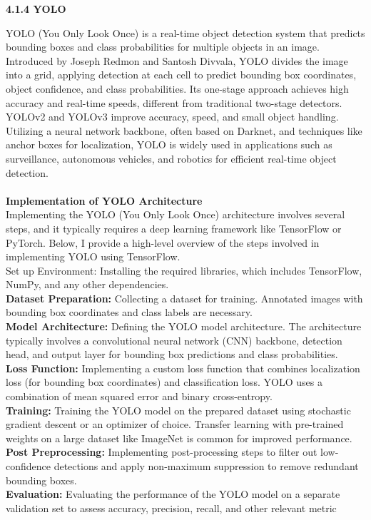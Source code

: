 \documentclass[12pt, English]{article}
\begin{document}
\begin{large}
\textbf{4.1.4 YOLO }\\
\end{large}
\text YOLO (You Only Look Once) is a real-time object detection system that predicts bounding boxes and class probabilities for multiple objects in an image. Introduced by Joseph Redmon and Santosh Divvala, YOLO divides the image into a grid, applying detection at each cell to predict bounding box coordinates, object
confidence, and class probabilities. Its one-stage approach achieves high accuracy and real-time speeds, different from traditional two-stage detectors. YOLOv2 and YOLOv3 improve accuracy, speed, and small object handling. Utilizing a neural network backbone, often based on Darknet, and techniques like anchor boxes for localization, YOLO is widely used in applications such as surveillance, autonomous vehicles, and robotics for efficient real-time object detection.\\
\\
\textbf {Implementation of YOLO Architecture}\\
Implementing the YOLO (You Only Look Once) architecture involves several steps, and it typically requires a deep learning framework like TensorFlow or PyTorch. Below, I provide a high-level overview of the steps involved in implementing YOLO using TensorFlow.\\
Set up Environment: Installing the required libraries, which includes TensorFlow, NumPy, and any other dependencies.\\
\textbf{Dataset Preparation: } Collecting a dataset for training. Annotated images with bounding box coordinates and class labels are necessary.\\
\textbf{Model Architecture: } Defining the YOLO model architecture. The architecture typically involves a convolutional neural network (CNN) backbone, detection head, and output layer for bounding box predictions and class probabilities.\\
\textbf{Loss Function: } Implementing a custom loss function that combines localization loss (for bounding box coordinates) and classification loss. YOLO uses a combination of mean squared error and binary cross-entropy.\\
\textbf{Training: } Training the YOLO model on the prepared dataset using stochastic gradient descent or an optimizer of choice. Transfer learning with pre-trained weights on a large dataset like ImageNet is common for improved performance.\\
\textbf{Post Preprocessing: } Implementing post-processing steps to filter out low-confidence detections and apply non-maximum suppression to remove redundant bounding boxes.\\
\textbf{Evaluation: } Evaluating the performance of the YOLO model on a separate validation set to assess accuracy, precision, recall, and other relevant metric\\
\\
\end{document}
